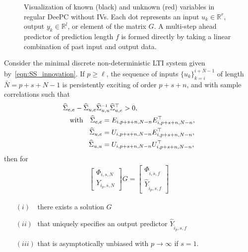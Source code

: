 \begin{figure}[b!]
\centering

\caption{Visualization of known (black) and unknown (red) variables in regular \ac{DeePC} without \ac{IVs}. Each dot represents an input $u_k\in\mathbb{R}^r$, output $y_k\in\mathbb{R}^l$, or element of the matrix $G$. A multi-step ahead predictor of prediction length $f$ is formed directly by taking a linear combination of past input and output data.\\\vspace{0.75mm}}
\label{fig:regular-DeePC}
\end{figure}
%
\setcounter{thm}{0}
\begin{thm}\label{theorem:main_result}
    Consider the minimal discrete non-deterministic \ac{LTI} system given by~\eqref{eqn:SS_innovation}. If $p\geq\ell$, the sequence of inputs $\{u_k\}_{k=i}^{i+\bar{N}-1}$ of length $\bar{N}=p+s+N-1$ is persistently exciting of order $p+s+n$, and with sample correlations such that%
    \begin{alignat}{2}%
    &\widehat{\Sigma}_{e,e} - \widehat{\Sigma}_{u,e} \widehat{\Sigma}_{u,u}\inv \widehat{\Sigma}_{u,e}^\top>0,\span\span\label{eq:PE_corUE2}\\
    &&\text{with}\quad\widehat{\Sigma}_{e,e}&=E_{i,p+s+n,N-n}E_{i,p+s+n,N-n}^\top,\notag\\
    &&\widehat{\Sigma}_{u,e}&=U_{i,p+s+n,N-n}E_{i,p+s+n,N-n}^\top,\notag\\
    &&\widehat{\Sigma}_{u,u}&=U_{i,p+s+n,N-n}U_{i,p+s+n,N-n}^\top,\notag
    \end{alignat}
    then for
    \begin{align}\label{eq:Theorem1}
        \begin{bmatrix}
            \Phi_{i,s,N}\\Y_{i_p,s,N}
        \end{bmatrix}G =
        \begin{bmatrix}
            \Phi_{\hat{i},s,f}\\\widehat{Y}_{\hat{i}_p,s,f}
        \end{bmatrix}
    \end{align}
    \begin{enumerate}
        \item[$(i)\phantom{ii}$] there exists a solution $G$\label{claim:G_exists}
        \item[$(ii)\phantom{i}$] that uniquely specifies an output predictor $\widehat{Y}_{\hat{i}_p,s,f}$
        \item[$(iii)$] that is asymptotically unbiased with $p\rightarrow\infty$ if $s=1$.
    \end{enumerate}
\end{thm}
